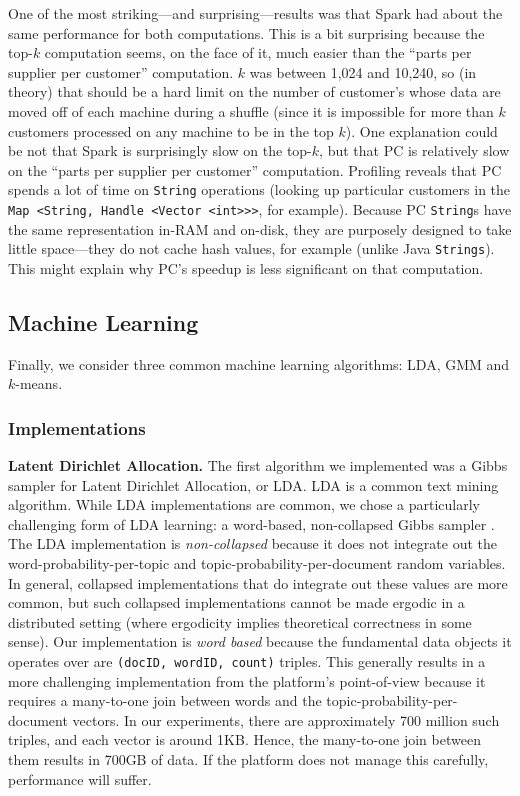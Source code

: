 One of the most striking---and surprising---results was that Spark had about the same performance for both computations.  This is
a bit surprising because the top-$k$ computation seems, on the face of it, much easier 
than the ``parts per supplier per customer'' computation.  $k$ was between 1,024 and 10,240, so (in theory) that should be
a hard limit on the number of customer's whose data are moved off of each machine during a shuffle 
(since it is impossible for more than $k$
customers processed on any machine to be in the top $k$).  One explanation could be not that Spark is surprisingly slow on the
top-$k$, but that PC is relatively slow on the ``parts per supplier per customer'' computation.  Profiling reveals that PC spends
a lot of time on \texttt{String} operations (looking up particular customers in the
\texttt{Map <String, Handle <Vector <int}\texttt{>}\texttt{>}\texttt{>}, for example).  
Because PC \texttt{String}s have the same representation in-RAM and on-disk, they are purposely designed to take little
space---they do not cache hash values, for example (unlike Java \texttt{Strings}).  This might explain why PC's speedup is
less significant on that computation.

\subsection {Machine Learning}

Finally, we consider three common machine learning algorithms: LDA,
GMM and $k$-means. 

\subsubsection {Implementations}


\noindent
\textbf{Latent Dirichlet Allocation.}
The first algorithm we implemented was a Gibbs sampler for
Latent Dirichlet Allocation, or LDA.  LDA is a common text mining algorithm.
While LDA implementations are common, we
chose a particularly challenging form of LDA learning:
a 
word-based,
non-collapsed Gibbs sampler \cite{jermaineExperimental}.  The LDA implementation
is \emph{non-collapsed} because it does not integrate out the word-probability-per-topic
and topic-probability-per-document random variables. In general, collapsed implementations
that do integrate out these values are more common, but such collapsed implementations
cannot be made ergodic in a distributed setting
(where ergodicity implies theoretical correctness in some sense).
Our implementation is
\emph{word based} because the fundamental data objects it operates over are \texttt{(docID, wordID, count)} 
triples.  This generally results in a more challenging
implementation from the platform's point-of-view because it requires a many-to-one join between words
and the topic-probability-per-document vectors.  In our experiments, there are approximately
700 million such triples, and each vector is around 1KB.  Hence, the many-to-one join between them results in
700GB of data.  If the platform does not manage this carefully, performance will suffer.

